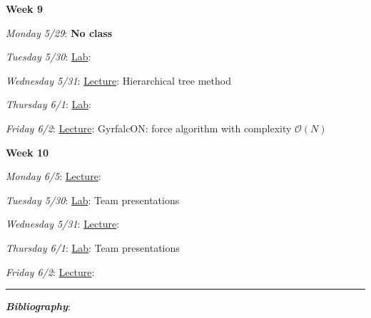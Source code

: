 \documentclass[12pt]{article}
\begin{document}
\noindent\textbf{Week 9}


\emph{Monday 5/29}: \textbf{No class}

\emph{Tuesday 5/30}: \underline{Lab}:

\emph{Wednesday 5/31}: \underline{Lecture}: Hierarchical tree method

\emph{Thursday 6/1}: \underline{Lab}:

\emph{Friday 6/2}: \underline{Lecture}: GyrfalcON: force algorithm with complexity $\mathcal{O}(N)$


\noindent\textbf{Week 10}

\emph{Monday 6/5}: \underline{Lecture}: 

\emph{Tuesday 5/30}: \underline{Lab}: Team presentations

\emph{Wednesday 5/31}: \underline{Lecture}: 

\emph{Thursday 6/1}: \underline{Lab}: Team presentations

\emph{Friday 6/2}: \underline{Lecture}: 



\begin{center}
  \rule{\textwidth}{0.5pt}
\end{center}
\nocite{*}

\noindent\textbf{\emph{Bibliography}}:\\
\end{document}
